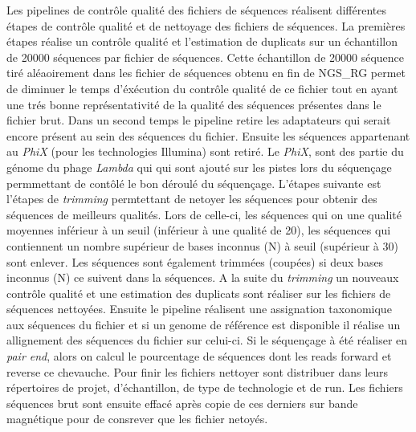 Les pipelines de contrôle qualité des fichiers de séquences réalisent différentes étapes de contrôle qualité et de nettoyage des fichiers de séquences. La premières étapes réalise un contrôle qualité et l'estimation de duplicats sur un échantillon de 20000 séquences par fichier de séquences. Cette échantillon de 20000 séquence tiré aléaoirement dans les fichier de séquences obtenu en fin de NGS\_RG permet de diminuer le temps d'éxécution du contrôle qualité de ce fichier tout en ayant une trés bonne représentativité de la qualité des séquences présentes dans le fichier brut. Dans un second temps le pipeline retire les adaptateurs qui serait encore présent au sein des séquences du fichier. Ensuite les séquences appartenant au \emph{PhiX} (pour les technologies Illumina) sont retiré. Le \emph{PhiX}, sont des partie du génome du phage \emph{Lambda} qui qui sont ajouté sur les pistes lors du séquençage permmettant de contôlé le bon déroulé du séquençage. L'étapes suivante est l'étapes de \emph{trimming} permtettant de netoyer les séquences pour obtenir des séquences de meilleurs qualités. Lors de celle-ci, les séquences qui on une qualité moyennes inférieur à un seuil (inférieur à une qualité de 20), les séquences qui contiennent un nombre supérieur de bases inconnus (N) à seuil (supérieur à 30) sont enlever. Les séquences sont également trimmées (coupées) si deux bases inconnus (N) ce suivent dans la séquences. A la suite du \emph{trimming} un nouveaux contrôle qualité et une estimation des duplicats sont réaliser sur les fichiers de séquences nettoyées. Ensuite le pipeline réalisent une assignation taxonomique aux séquences du fichier et si un genome de référence est disponible il réalise un allignement des séquences du fichier sur celui-ci. Si le séquençage à été réaliser en \emph{pair end}, alors on calcul le pourcentage de séquences dont les reads forward et reverse ce chevauche. Pour finir les fichiers nettoyer sont distribuer dans leurs répertoires de projet, d'échantillon, de type de technologie et de run. Les fichiers séquences brut sont ensuite effacé après copie de ces derniers sur bande magnétique pour de consrever que les fichier netoyés.\\
























